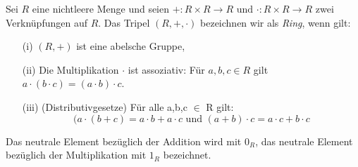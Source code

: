 \begin{defn}\label{Ring} %
Sei $R$ eine nichtleere Menge und seien $+ : R \times R \to R \text{ und } \cdot: R \times R \to R $ zwei Verknüpfungen auf $R$. Das Tripel $\left(R, +, \cdot\right)$ bezeichnen wir als \textit{Ring}, wenn gilt:
%
\begin{enumerate}
\item[(i)] $(R, +)$ ist eine abelsche Gruppe,
\item[(ii)] Die Multiplikation $\cdot$ ist assoziativ: Für $a, b,c \in R$ gilt $a\cdot \left(b \cdot c\right) = \left(a \cdot b \right) \cdot c$.%
\item[(iii)] (Distributivgesetze) Für alle a,b,c $\in$ R gilt:\\
\[(a \cdot(b +c) = a \cdot b + a \cdot c \text{ und }
(a+b) \cdot c = a \cdot c + b \cdot c \] 
\end{enumerate}
\end{defn}
Das neutrale Element bezüglich der Addition wird mit \textbf{$0_R$}, das neutrale Element bezüglich der Multiplikation mit \textbf{$1_R$} bezeichnet.

